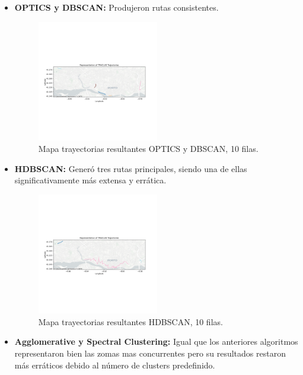 \begin{itemize}
    \item \textbf{OPTICS y DBSCAN:} Produjeron rutas consistentes.
    
	\begin{figure}[h!]
    		\centering
    		\includegraphics[width=0.5\textwidth]{img/Taxis/map_optics_10datos.png}
    		\caption{Mapa trayectorias resultantes OPTICS y DBSCAN, 10 filas.}
    		\label{fig:taxis_10}
	\end{figure}    
    
    \item \textbf{HDBSCAN:} Generó tres rutas principales, siendo una de ellas significativamente más extensa y errática.
    
    \begin{figure}[h!]
    		\centering
    		\includegraphics[width=0.5\textwidth]{img/Taxis/map_hdbscan_10datos.png}
    		\caption{Mapa trayectorias resultantes HDBSCAN, 10 filas.}
    		\label{fig:taxis_10}
	\end{figure}  
    
    \item \textbf{Agglomerative y Spectral Clustering:} Igual que los anteriores algoritmos representaron bien las zomas mas concurrentes pero su resultados restaron más erráticos debido al número de clusters predefinido.
    

\end{itemize}
